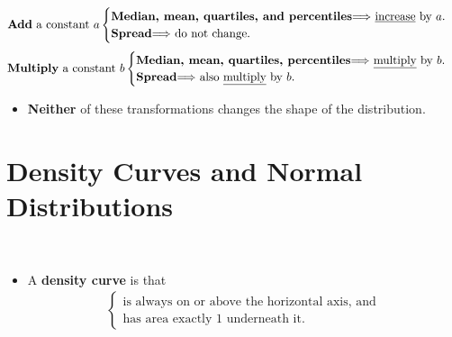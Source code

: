 \documentclass[Main.tex]{subfiles}
\begin{document}
\begin{example}
				\begin{subequations}
					\begin{align}
					\text{\textbf{Add} a constant $a$}
						\begin{cases}
						 \text{\textbf{Median, mean, quartiles, and percentiles}$\Longrightarrow$ \underline{increase} by $a$.} \\
						 \text{\textbf{Spread}$\Longrightarrow$ do not change.}
						 \end{cases}
					 \end{align}
				 \end{subequations}			 
				 \begin{subequations}
				 	\begin{align}
				 		\text{\textbf{Multiply} a constant $b$}
				 		\begin{cases}
				 			\text{\textbf{Median, mean, quartiles, percentiles}$\Longrightarrow$ \underline{multiply} by $b$.} \\
				 			\text{\textbf{Spread}$\Longrightarrow$ also \underline{multiply} by $b$.}
				 		\end{cases}
				 	\end{align}
				 \end{subequations}
		
		\begin{itemize}	
			\item \textbf{Neither} of these transformations changes the shape of the distribution.
		\end{itemize}\hfill 
	\end{example}
	\newpage
	
	\section{Density Curves and Normal Distributions}
	
	\begin{exercise} \hfill \\
		
		\begin{itemize}
			\item A \textbf{density curve} is that			
			\begin{subequations}
			\begin{align}
				\begin{cases}
					\text{is always on or above the horizontal axis, and}\\
					\text{has area exactly 1 underneath it.}
				\end{cases}
			\end{align}
			\end{subequations}
		\end{itemize}	
	\end{exercise}
		
\end{document}
